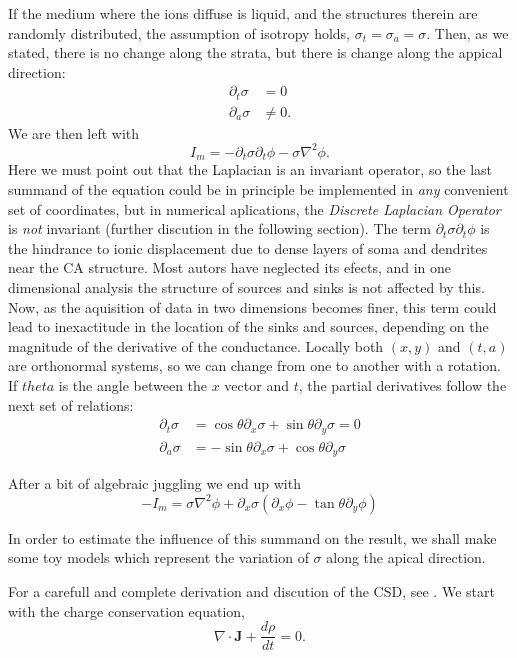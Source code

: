 \documentclass{article}
\newcommand{\Jd}{\mathbf{J}}
\begin{document}
If the medium where the ions diffuse is liquid, and the structures
therein are randomly distributed, the assumption of isotropy holds, 
$\sigma_t=\sigma_a=\sigma$. Then, as we stated, there is no
change along the strata, but there is change along the appical
direction:
\begin{align}
\partial_t \sigma & =0 \\
\partial_a \sigma & \neq 0. 
\end{align}
We are then left with
\begin{equation}
I_m=-\partial_t \sigma \partial_t \phi - \sigma \nabla^2 \phi.
\end{equation}
Here we must point out that the Laplacian is an invariant operator,
so the last summand of the equation could be in principle be implemented
in \emph{any} convenient set of coordinates, but in numerical aplications,
the \emph{Discrete Laplacian Operator} is \emph{not} invariant (further
discution in the following section). 
The term $\partial_t \sigma \partial_t \phi$ is the hindrance to 
ionic displacement due to dense layers of soma and dendrites near the
CA structure. Most autors have neglected its efects, and in one
dimensional analysis the structure of sources and sinks is not affected
by this. Now, as the aquisition of data in two dimensions becomes
finer, this term could lead to inexactitude in the location of the
sinks and sources, depending on the magnitude of the
derivative of the conductance. Locally both $(x,y)$ and
$(t,a)$ are orthonormal systems, so we can change from one to another 
with a rotation. If $theta$ is the angle between the $x$ vector
and $t$, the partial derivatives follow the next set of relations:
\begin{align}
\partial_t \sigma &= \cos\theta \partial_x \sigma +\sin\theta \partial_y \sigma=0\\
\partial_a \sigma &= -\sin\theta \partial_x \sigma +\cos\theta \partial_y \sigma
\end{align}

After a bit of algebraic juggling we end up with
\begin{equation}
-I_m=\sigma\nabla^2 \phi + 
\partial_x\sigma (\partial_x \phi - \tan \theta \partial_y \phi)
\end{equation} 


In order to estimate the influence
of this summand on the result, we shall make some toy models which
represent the variation of $\sigma$ along the apical direction.






For a carefull and complete derivation and discution of the CSD, 
see \cite{Bedard11}. We start with the charge conservation equation,
\begin{equation}
\nabla \cdot \Jd + \frac{d \rho}{d t} =0.
\end{equation}





\end{document}
